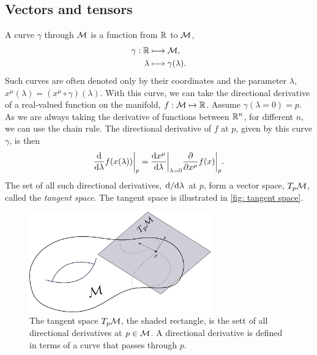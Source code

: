 \subsection{Vectors and tensors}

A curve $\gamma$ through $\mathcal{M}$ is a function from $\mathbb{R}$ to $\mathcal{M}$,
%
\begin{align}
    \gamma : \mathbb{R} &\longmapsto \mathcal{M}, \\
    \lambda & \longmapsto \gamma(\lambda).
\end{align}
%
Such curves are often denoted only by their coordinates and the parameter $\lambda$, $x^\mu(\lambda) = (x^\mu \circ \gamma)(\lambda)$.
With this curve, we can take the directional derivative of a real-valued function on the manifold, $f: \mathcal{M} \mapsto \mathbb{R}$.
Assume $\gamma(\lambda = 0) = p$.
As we are always taking the derivative of functions between $\mathbb{R}^n$, for different $n$, we can use the chain rule.
The directional derivative of $f$ at $p$, given by this curve $\gamma$, is then
%
\begin{equation}
    \odv{}{\lambda} f(x(\lambda)) \bigg |_p = \odv{x^\mu}{\lambda} \bigg |_{\lambda = 0}  \pdv{}{x^\mu} f(x) \bigg |_p.
\end{equation}
%
The set of all such directional derivatives, $\odv{}/{\lambda}$ at $p$, form a vector space, $T_p \mathcal{M}$, called the \emph{tangent space}.
The tangent space is illustrated in \autoref{fig: tangent space}.


\begin{figure}[H]
    \centering
    \includegraphics[width=0.7\textwidth]{figurer/tangent space.pdf} 
    \caption{
        The tangent space $T_p \mathcal{M}$, the shaded rectangle, is the sett of all directional derivatives at $p\in \mathcal{M}$. A directional derivative is defined in terms of a curve that passes through $p$.
        } 
    \label{fig: tangent space}
\end{figure} 


